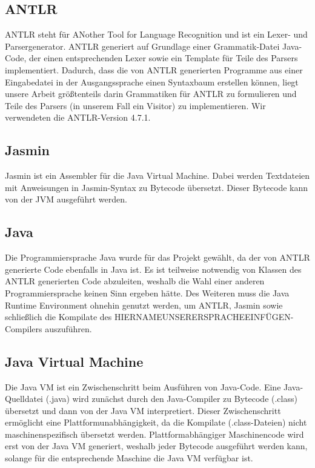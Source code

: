 \documentclass[12pt, a4paper, oneside, ngerman]{article}
\begin{document}
\subsection{ANTLR}
ANTLR steht für ANother Tool for Language Recognition und ist ein Lexer- und Parsergenerator. ANTLR generiert auf Grundlage einer Grammatik-Datei Java-Code, der einen entsprechenden Lexer sowie ein Template für Teile des Parsers implementiert. Dadurch, dass die von ANTLR generierten Programme aus einer Eingabedatei in der Ausgangssprache einen Syntaxbaum erstellen können, liegt unsere Arbeit größtenteils darin Grammatiken für ANTLR zu formulieren und Teile des Parsers (in unserem Fall ein Visitor) zu implementieren. Wir verwendeten die ANTLR-Version 4.7.1.

\subsection{Jasmin}
Jasmin ist ein Assembler für die Java Virtual Machine. Dabei werden Textdateien mit Anweisungen in Jasmin-Syntax zu Bytecode übersetzt. Dieser Bytecode kann von der JVM ausgeführt werden.

\subsection{Java}
Die Programmiersprache Java wurde für das Projekt gewählt, da der von ANTLR generierte Code ebenfalls in Java ist. Es ist teilweise notwendig von Klassen des ANTLR generierten Code abzuleiten, weshalb die Wahl einer anderen Programmiersprache keinen Sinn ergeben hätte. 
Des Weiteren muss die Java Runtime Environment ohnehin genutzt werden, um ANTLR, Jasmin sowie schließlich die Kompilate des HIERNAMEUNSERERSPRACHEEINFÜGEN-Compilers auszuführen.

\subsection{Java Virtual Machine}
Die Java VM ist ein Zwischenschritt beim Ausführen von Java-Code. Eine Java-Quelldatei (.java) wird zunächst durch den Java-Compiler zu Bytecode (.class) übersetzt und dann von der Java VM interpretiert. Dieser Zwischenschritt ermöglicht eine Plattformunabhängigkeit, da die Kompilate (.class-Dateien) nicht maschinenspezifisch übersetzt werden. Plattformabhängiger Maschinencode wird erst von der Java VM generiert, weshalb jeder Bytecode ausgeführt werden kann, solange für die entsprechende Maschine die Java VM verfügbar ist.
\end{document}

